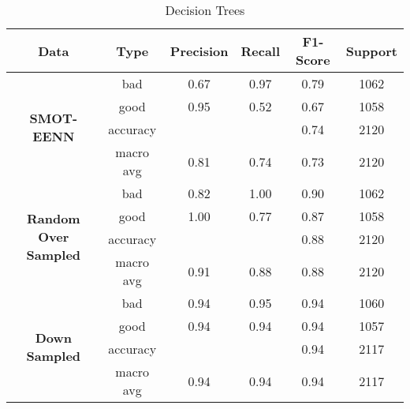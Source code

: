 \documentclass[conference]{IEEEtran}
\begin{document}
    \begin{table}[!t]
        \renewcommand{\arraystretch}{1.25}
        \caption{Decision Trees}
        \label{table:trees}
        \centering
        \begin{tabular}{ |c|c|c|c|c|c| }
            \hline
                \textbf{Data} & \textbf{Type} & \textbf{Precision} & \textbf{Recall} & \textbf{F1-Score} & \textbf{Support} \\
            \hline
                \multirow{4}{1.1cm}{\centering \textbf{SMOT-EENN}} & bad & 0.67 & 0.97 & 0.79 & 1062 \\
            \cline{2-6}
                 & good & 0.95 & 0.52 & 0.67 & 1058 \\
            \cline{2-6}
                 & accuracy &  &  & 0.74 & 2120 \\
            \cline{2-6}
                 & macro avg & 0.81 & 0.74 & 0.73 & 2120 \\
            \hline
                \multirow{4}{1.1cm}{\centering \textbf{Random Over Sampled}} & bad & 0.82 & 1.00 & 0.90 & 1062 \\
            \cline{2-6}
                 & good & 1.00 & 0.77 & 0.87 & 1058 \\
            \cline{2-6}
                 & accuracy &  &  & 0.88 & 2120 \\
            \cline{2-6}
                 & macro avg & 0.91 & 0.88 & 0.88 & 2120 \\
            \hline
                \multirow{4}{1.1cm}{\centering \textbf{\textbf{Down Sampled}}} & bad & 0.94 & 0.95 & 0.94 & 1060 \\
            \cline{2-6}
                 & good & 0.94 & 0.94 & 0.94 & 1057 \\
            \cline{2-6}
                 & accuracy &  &  & 0.94 & 2117 \\
            \cline{2-6}
                 & macro avg & 0.94 & 0.94 & 0.94 & 2117 \\
            \hline
        \end{tabular}
    \end{table}
    
\end{document}
